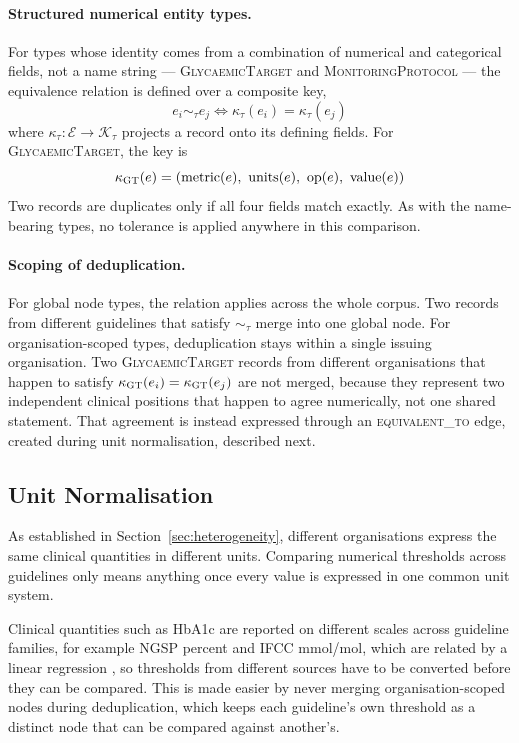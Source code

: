 \paragraph{Structured numerical entity types.}
For types whose identity comes from a combination of numerical and categorical fields, not a name string --- \textsc{GlycaemicTarget} and \textsc{MonitoringProtocol} --- the equivalence relation is defined over a composite key,
$$e_i \sim_\tau e_j \iff \kappa_\tau(e_i) = \kappa_\tau(e_j)$$
where $\kappa_\tau: \mathcal{E} \rightarrow \mathcal{K}_\tau$ projects a record onto its defining fields. For \textsc{GlycaemicTarget}, the key is
$$\kappa_{\textsc{GT}}(e) = (\text{metric}(e),\ \text{units}(e),\ \text{op}(e),\ \text{value}(e))$$
Two records are duplicates only if all four fields match exactly. As with the name-bearing types, no tolerance is applied anywhere in this comparison.

\paragraph{Scoping of deduplication.}
For global node types, the relation applies across the whole corpus. Two records from different guidelines that satisfy $\sim_\tau$ merge into one global node. For organisation-scoped types, deduplication stays within a single issuing organisation. Two \textsc{GlycaemicTarget} records from different organisations that happen to satisfy $\kappa_{\textsc{GT}}(e_i) = \kappa_{\textsc{GT}}(e_j)$ are not merged, because they represent two independent clinical positions that happen to agree numerically, not one shared statement. That agreement is instead expressed through an \textsc{equivalent\_to} edge, created during unit normalisation, described next.

\subsection{Unit Normalisation}
\label{sec:unit-normalisation}

As established in Section~\ref{sec:heterogeneity}, different organisations express the same clinical quantities in different units. Comparing numerical thresholds across guidelines only means anything once every value is expressed in one common unit system.

Clinical quantities such as HbA1c are reported on different scales across
guideline families, for example NGSP percent and IFCC mmol/mol, which are
related by a linear regression \cite{hoelzel2004}, so thresholds from
different sources have to be converted before they can be compared. This is
made easier by never merging organisation-scoped nodes during deduplication,
which keeps each guideline's own threshold as a distinct node that can be
compared against another's.

